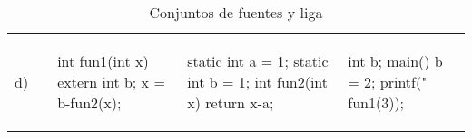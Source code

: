 \begin{table}
\begin{tabular}{p{0.2cm}|p{3cm}|p{3.5cm}|p{3.5cm}|p{3cm}}
d)
&
\begin{codecell}

\end{codecell}
&
\begin{codecell}
int fun1(int x)
{
	extern int b;
	x = b-fun2(x);
}
\end{codecell}
&
\begin{codecell}
static int 
	a = 1;
static int 
	b = 1;
int fun2(int x) 
{
	return x-a;
}
\end{codecell}
&
\begin{codecell}
int b;
main()
{
	b = 2;
	printf("%
		fun1(3));
}
\end{codecell}\\

\end{tabular}
\caption{Conjuntos de fuentes y liga}
\label{tab:fuentes}
\end{table}
